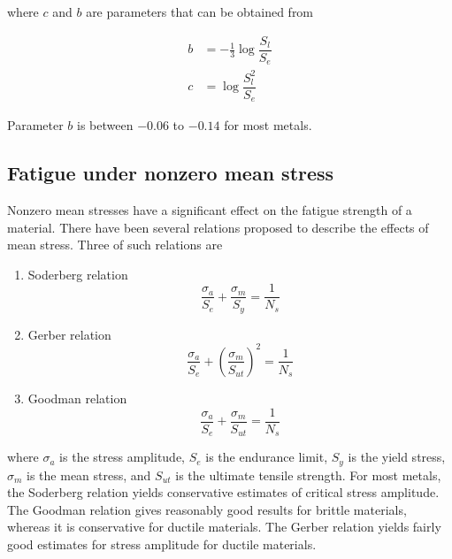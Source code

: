 \documentclass[
10pt,
a4paper,
openany,
svgnames,
]{book}
\begin{document}
where $c$ and $b$ are parameters that can be obtained from

\begin{align*}
  b &= - \frac{1}{3} \log \dfrac{S_l}{S_e} \\
  c &= \log \dfrac{S_l^2}{S_e}
\end{align*}

Parameter $b$ is between $-0.06$ to $-0.14$ for most metals.

\subsection{Fatigue under nonzero mean stress}

Nonzero mean stresses have a significant effect on the fatigue strength of a material. There have been several relations proposed to describe the effects of mean stress. Three of such relations are

\begin{enumerate}
\item Soderberg relation
  \begin{equation}
    \label{eqn: soderberg design eqn}
    \frac{\sigma_a}{S_e} + \frac{\sigma _m}{S_y} = \frac{1}{N_s}
  \end{equation}
\item Gerber relation
  \begin{equation}
    \label{eqn: gerber design eqn}
    \frac{\sigma_a}{S_e} + \left( \frac{\sigma_m}{S_{ut}} \right)^2 = \frac{1}{N_s}
  \end{equation}
\item Goodman relation
  \begin{equation}
    \label{eqn: goodman design eqn}
    \frac{\sigma_a}{S_e} + \frac{\sigma _m}{S_{ut}} = \frac{1}{N_s}
  \end{equation}
\end{enumerate}

where $\sigma_a$ is the stress amplitude, $S_e$ is the endurance limit, $S_y$ is the yield stress, $\sigma_m$ is the mean stress, and $S_{ut}$ is the ultimate tensile strength. For most metals, the Soderberg relation yields conservative estimates of critical stress amplitude. The Goodman relation gives reasonably good results for brittle materials, whereas it is conservative for ductile materials. The Gerber relation yields fairly good estimates for stress amplitude for ductile materials.
\end{document}
